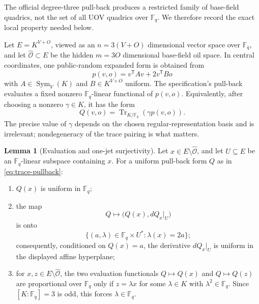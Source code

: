 \documentclass[11pt,a4paper]{article}
\theoremstyle{definition}
\newtheorem{lemma}[theorem]{Lemma}
\theoremstyle{remark}
\newcommand{\F}{\mathbb F}
\newcommand{\cO}{\mathcal O}
\newcommand{\Sym}{\operatorname{Sym}}
\newcommand{\Tr}{\operatorname{Tr}}
\begin{document}
The official degree-three pull-back produces a restricted family of base-field quadrics, not the set of all UOV quadrics over $\F_q$.  We therefore record the exact local property needed below.

Let $E=K^{V+O}$, viewed as an $n=3(V+O)$ dimensional vector space over $\F_q$, and let $\widehat{\cO}\subset E$ be the hidden $m=3O$ dimensional base-field oil space.  In central coordinates, one public-random expanded form is obtained from
\[
 p(v,o)=v^{\mathsf T}Av+2v^{\mathsf T}Bo
\]
with $A\in\Sym_V(K)$ and $B\in K^{V\times O}$ uniform.  The specification's pull-back evaluates a fixed nonzero $\F_q$-linear functional of $p(v,o)$.  Equivalently, after choosing a nonzero $\gamma\in K$, it has the form
\begin{equation}\label{eq:trace-pullback}
 Q(v,o)=\Tr_{K/\F_q}\!\left(\gamma p(v,o)\right).
\end{equation}
The precise value of $\gamma$ depends on the chosen regular-representation basis and is irrelevant; nondegeneracy of the trace pairing is what matters.

\begin{lemma}[Evaluation and one-jet surjectivity]\label{lem:pullback-one-jet}
Let $x\in E\setminus\widehat{\cO}$, and let $U\subseteq E$ be an $\F_q$-linear subspace containing $x$.  For a uniform pull-back form $Q$ as in \eqref{eq:trace-pullback}:
\begin{enumerate}
\item $Q(x)$ is uniform in $\F_q$;
\item the map
\[
 Q\longmapsto\bigl(Q(x),dQ_x|_U\bigr)
\]
is onto
\[
 \{(a,\lambda)\in\F_q\times U^*: \lambda(x)=2a\};
\]
consequently, conditioned on $Q(x)=a$, the derivative $dQ_x|_U$ is uniform in the displayed affine hyperplane;
\item for $x,z\in E\setminus\widehat{\cO}$, the two evaluation functionals $Q\mapsto Q(x)$ and $Q\mapsto Q(z)$ are proportional over $\F_q$ only if $z=\lambda x$ for some $\lambda\in K$ with $\lambda^2\in\F_q$.  Since $[K:\F_q]=3$ is odd, this forces $\lambda\in\F_q$.
\end{enumerate}
\end{lemma}
\end{document}

